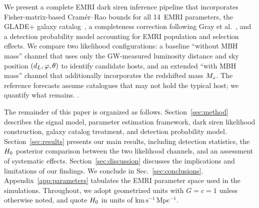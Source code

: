 We present a complete EMRI dark siren inference pipeline that
incorporates Fisher-matrix-based Cram\'er--Rao bounds for all
14~EMRI parameters, the GLADE+ galaxy catalog~\cite{Dalya:2021ewn},
a completeness correction following Gray et
al.~\cite{Gray:2019ksv}, and a detection probability model
accounting for EMRI population and selection effects.
We compare two likelihood
configurations: a baseline ``without MBH mass'' channel that uses only
the GW-measured luminosity distance and sky position $(d_L, \varphi,
\theta)$ to identify candidate hosts, and an extended ``with MBH
mass'' channel that additionally incorporates the redshifted mass
$M_z$.  The reference forecasts assume catalogues that may not hold the
typical host; we quantify what remains.
.

The remainder of this paper is organized as follows.
Section~\ref{sec:method} describes the signal model, parameter
estimation framework, dark siren likelihood construction, galaxy
catalog treatment, and detection probability model.
Section~\ref{sec:results} presents our main results, including
detection statistics, the $H_0$ posterior comparison between the two
likelihood channels, and an assessment of systematic effects.
Section~\ref{sec:discussion} discusses the implications and
limitations of our findings.  We conclude in
Sec.~\ref{sec:conclusions}.  Appendix~\ref{app:parameters} tabulates
the EMRI parameter space used in the simulations.
Throughout, we adopt geometrized units with $G = c = 1$ unless
otherwise noted, and quote $H_0$ in units of
$\mathrm{km\,s^{-1}\,Mpc^{-1}}$.
